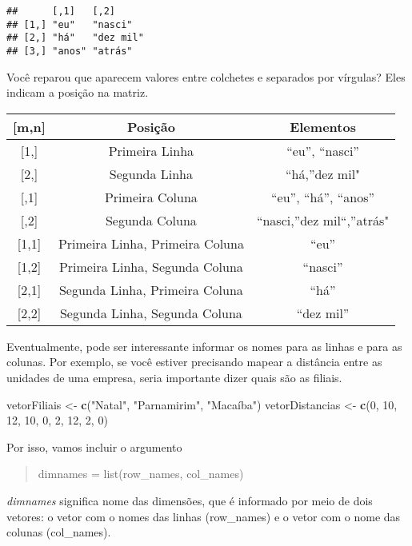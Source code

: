 \documentclass[
]{book}
\newenvironment{Shaded}{\begin{snugshade}}{\end{snugshade}}
\newcommand{\DecValTok}[1]{\textcolor[rgb]{0.00,0.00,0.81}{#1}}
\newcommand{\KeywordTok}[1]{\textcolor[rgb]{0.13,0.29,0.53}{\textbf{#1}}}
\newcommand{\NormalTok}[1]{#1}
\newcommand{\StringTok}[1]{\textcolor[rgb]{0.31,0.60,0.02}{#1}}
\begin{document}
\begin{verbatim}
##      [,1]   [,2]     
## [1,] "eu"   "nasci"  
## [2,] "há"   "dez mil"
## [3,] "anos" "atrás"
\end{verbatim}

Você reparou que aparecem valores entre colchetes e separados por vírgulas? Eles indicam a posição na matriz.

\begin{longtable}[]{@{}ccc@{}}
\toprule
{[}m,n{]} & Posição & Elementos\tabularnewline
\midrule
\endhead
{[}1,{]} & Primeira Linha & ``eu'', ``nasci''\tabularnewline
{[}2,{]} & Segunda Linha & ``há,''dez mil"\tabularnewline
{[},1{]} & Primeira Coluna & ``eu'', ``há'', ``anos''\tabularnewline
{[},2{]} & Segunda Coluna & ``nasci,''dez mil``,''atrás"\tabularnewline
{[}1,1{]} & Primeira Linha, Primeira Coluna & ``eu''\tabularnewline
{[}1,2{]} & Primeira Linha, Segunda Coluna & ``nasci''\tabularnewline
{[}2,1{]} & Segunda Linha, Primeira Coluna & ``há''\tabularnewline
{[}2,2{]} & Segunda Linha, Segunda Coluna & ``dez mil''\tabularnewline
\bottomrule
\end{longtable}

Eventualmente, pode ser interessante informar os nomes para as linhas e para as colunas. Por exemplo, se você estiver precisando mapear a distância entre as unidades de uma empresa, seria importante dizer quais são as filiais.

\begin{Shaded}
\begin{Highlighting}[]
\NormalTok{vetorFiliais <-}\StringTok{ }\KeywordTok{c}\NormalTok{(}\StringTok{"Natal"}\NormalTok{, }\StringTok{"Parnamirim"}\NormalTok{, }\StringTok{"Macaíba"}\NormalTok{)}
\NormalTok{vetorDistancias <-}\StringTok{ }\KeywordTok{c}\NormalTok{(}\DecValTok{0}\NormalTok{, }\DecValTok{10}\NormalTok{, }\DecValTok{12}\NormalTok{, }\DecValTok{10}\NormalTok{, }\DecValTok{0}\NormalTok{, }\DecValTok{2}\NormalTok{, }\DecValTok{12}\NormalTok{, }\DecValTok{2}\NormalTok{, }\DecValTok{0}\NormalTok{)}
\end{Highlighting}
\end{Shaded}

Por isso, vamos incluir o argumento

\begin{quote}
dimnames = list(row\_names, col\_names)
\end{quote}

\emph{dimnames} significa nome das dimensões, que é informado por meio de dois vetores: o vetor com o nomes das linhas (row\_names) e o vetor com o nome das colunas (col\_names).
\end{document}
